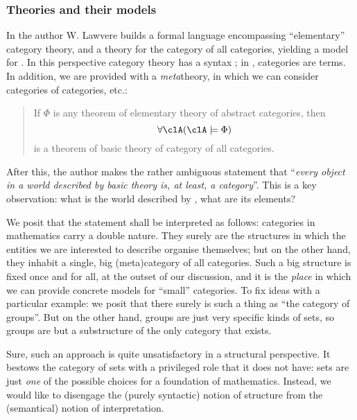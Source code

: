 \subsubsection{Theories and their models}
In \cite{lajolla} the author W. Lawvere builds a formal language  encompassing ``elementary'' category theory, and a theory  for the category of all categories, yielding a model for . In this perspective category theory has a syntax \CT; in \CT, categories are terms. In addition, we are provided with a \emph{meta}theory, in which we can consider categories of categories, etc.:%
\begin{quote}
	If $\Phi$ is any theorem of elementary theory of abstract categories, then
	\[\forall \clA (\clA \models \Phi)\]
	is a theorem of basic theory of category of all categories. \hfill \cite{lajolla}
\end{quote}
After this, the author makes the rather ambiguous statement that ``\textit{every object in a world described by basic theory is, at least, a category}''. This is a key observation: what is the world described by , what are its elements?

We posit that the statement shall be interpreted as follows: categories in mathematics carry a double nature. They surely are the structures in which the entities we are interested to describe organise themselves; but on the other hand, they inhabit a single, big (meta)category of all categories. Such a big structure is fixed once and for all, at the outset of our discussion, and it is the \emph{place} in which we can provide concrete models for ``small'' categories. To fix ideas with a particular example: we posit that there surely is such a thing as ``the category of groups''. But on the other hand, groups are just very specific kinds of sets, so groups are but a substructure of the only category that exists.%

Sure, such an approach is quite unsatisfactory in a structural perspective. It bestows the category of sets with a privileged role that it does not have: sets are just \emph{one} of the possible choices for a foundation of mathematics. Instead, we would like to disengage the (purely syntactic) notion of structure from the (semantical) notion of interpretation.

